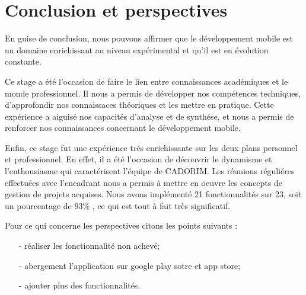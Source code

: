 \chapter*{Conclusion et perspectives}

\begin{comment}
	En d’autres termes, nous avons la version beta (test et amélioration avant sa publication) de
	l’application installée dans notre environnement de développement. Aussi, nous avons prévu la
	période pendant laquelle la solution finale sera déployée les plateformes de téléchargement.
	
	
	
	pour ce qui concerne les perspectives citons les points suivants :
	-réaliser les fonctionnalité non achevé;
	-abergement l'application sur google play sotre et app store;
	-ajouter plus des fonctionnalités.
\end{comment}
En guise de conclusion, nous pouvons affirmer que le développement mobile est un domaine enrichissant au niveau expérimental et qu'il est en évolution constante.
\newline

Ce stage a été l'occasion de faire le lien entre  connaissances académiques et le monde professionnel. Il nous a permis de développer nos compétences techniques, d'approfondir nos connaissaces théoriques et les mettre en pratique. Cette expérience a aiguisé nos capacités d'analyse et de synthése, et nous a permis de renforcer nos connaissances concernant le développement mobile.
\newline

Enfin, ce stage fut une expérience trés enrichissante sur les deux plans personnel et professionnel. En effet, il a été l'occasion de découvrir le dynamisme et l'enthousiasme qui caractérisent l'équipe de CADORIM. Les réunions réguliéres effectuées avec l'encadrant nous a permis à mettre en oeuvre les concepts de gestion de projets acquises. 
\newline
Nous avons implémenté 21 fonctionnalités sur 23, soit un pourcentage de $93 \%$ , ce qui est tout à fait très significatif.
\newline

 Pour ce qui concerne les perspectives citons les points suivants :
\begin{enumerate}
	\item[-]réaliser les fonctionnalité non achevé;
	\item[-]abergement l'application sur google play sotre et app store;
	\item[-]ajouter plus des fonctionnalités.
\end{enumerate}
